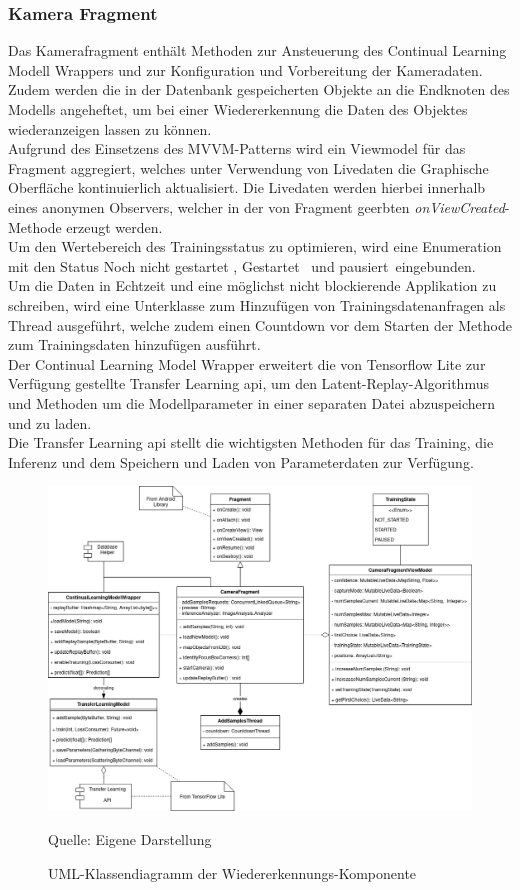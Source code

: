 \documentclass[oneside]{ausarbeitung}
\begin{document}
\subsubsection{Kamera Fragment}
Das Kamerafragment enthält Methoden zur Ansteuerung des Continual Learning Modell Wrappers und zur Konfiguration und Vorbereitung der Kameradaten. Zudem werden die in der Datenbank gespeicherten Objekte an die Endknoten des Modells angeheftet, um bei einer Wiedererkennung die Daten des Objektes wiederanzeigen lassen zu können.\\ 
Aufgrund des Einsetzens des MVVM-Patterns wird ein Viewmodel für das Fragment aggregiert, welches unter Verwendung von Livedaten die Graphische Oberfläche kontinuierlich aktualisiert. Die Livedaten werden hierbei innerhalb eines anonymen Observers, welcher in der von Fragment geerbten \glqq \textit{onViewCreated}\grqq-Methode erzeugt werden.\\
Um den Wertebereich des Trainingsstatus zu optimieren, wird eine Enumeration mit den Status \glqq Noch nicht gestartet \grqq, \glqq Gestartet \grqq\ und \glqq pausiert\grqq\ eingebunden.\\
Um die Daten in Echtzeit und eine möglichst nicht blockierende Applikation zu schreiben, wird eine Unterklasse zum Hinzufügen von Trainingsdatenanfragen als Thread ausgeführt, welche zudem einen Countdown vor dem Starten der Methode zum Trainingsdaten hinzufügen ausführt.\\
Der Continual Learning Model Wrapper erweitert die von Tensorflow Lite zur Verfügung gestellte Transfer Learning \ac{api}, um den Latent-Replay-Algorithmus und Methoden um die Modellparameter in einer separaten Datei abzuspeichern und zu laden.\\
Die Transfer Learning \ac{api} stellt die wichtigsten Methoden für das Training, die Inferenz und dem Speichern und Laden von Parameterdaten zur Verfügung.

\begin{figure}[hptb]
	\centering
	\includegraphics[height=0.55\textheight]{images/camera-fragment-class-diagram.png}
	\caption{UML-Klassendiagramm der Wiedererkennungs-Komponente} Quelle: Eigene Darstellung
	\label{fig:recognition-classdiagram}
\end{figure}
\end{document}
